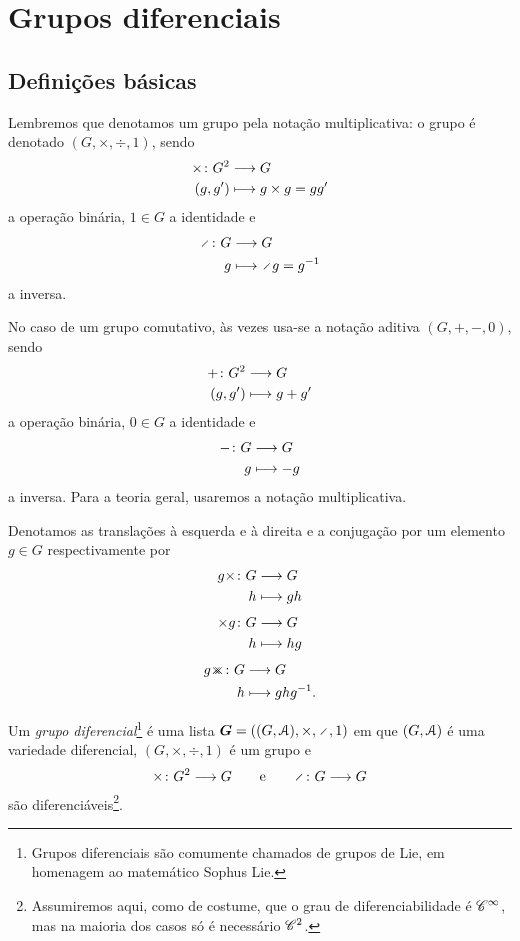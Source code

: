 \chapter{Grupos diferenciais}

\section{Definições básicas}

Lembremos que denotamos um grupo pela notação multiplicativa: o grupo é denotado $(G,\times,\div,1)$, sendo
	\begin{align*}
	{\times}\colon {G^2} &\longrightarrow {G} \\{(g,g')} &\longmapsto g \times g = gg'
	\end{align*}
a operação binária, $1 \in G$ a identidade e
	\begin{align*}
	\func{\div}{G}{G}{g}{\div g = g\inv}
	\end{align*}
a inversa.

No caso de um grupo comutativo, às vezes usa-se a notação aditiva $(G,+,-,0)$, sendo
	\begin{align*}
	{+}\colon {G^2} &\longrightarrow {G} \\{(g,g')} &\longmapsto g+g'
	\end{align*}
a operação binária, $0 \in G$ a identidade e
	\begin{align*}
	{-}\colon {G} &\longrightarrow {G} \\{g} &\longmapsto -g
	\end{align*}
a inversa. Para a teoria geral, usaremos a notação multiplicativa.

Denotamos as translações à esquerda e à direita e a conjugação por um elemento $g \in G$ respectivamente por
	\begin{align*}
	{g \times}\colon {G} &\longrightarrow {G} \\{h} &\longmapsto gh
	\end{align*}
	\begin{align*}
	{\times g}\colon {G} &\longrightarrow {G} \\{h} &\longmapsto hg
	\end{align*}
	\begin{align*}
	\func{g\con}{G}{G}{h}{ghg\inv}.
	\end{align*}

\begin{definition}
Um \emph{grupo diferencial}\footnote{Grupos diferenciais são comumente chamados de grupos de Lie, em homenagem ao matemático Sophus Lie.} é uma lista $\bm G = ((G,\atlas),\times,\div,1)$ em que $(G,\mathcal{A})$ é uma variedade diferencial, $(G,\times,\div,1)$ é um grupo e
	\begin{equation*}
	\fun{\times}{G^2}{G} \qquad\text{e}\qquad \fun{\div}{G}{G}
	\end{equation*}
são diferenciáveis\footnote{Assumiremos aqui, como de costume, que o grau de diferenciabilidade é $\mathscr{C}^\infty$, mas na maioria dos casos só é necessário $\mathscr{C}^2$.}.
\end{definition}

